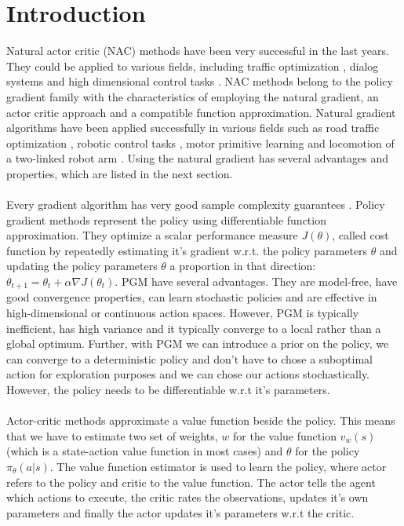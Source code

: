 \section{Introduction}
\label{sec:intro}

Natural actor critic (NAC) methods \citep{peters2005natural} have been very successful in the last years. They could be applied to various fields, including traffic optimization \citep{richter2007natural}, dialog systems \citep{jurvcivcek2011natural} and high dimensional control tasks \citep{peters2007applying, peters2008natural, peters2008reinforcement, peters2003reinforcement}. NAC methods belong to the policy gradient family with the characteristics of employing the natural gradient, an actor critic approach and a compatible function approximation. Natural gradient algorithms have been applied successfully in various fields such as road traffic optimization \cite{richter2007natural}, robotic control tasks \cite{kim2010impedance}, motor primitive learning \cite{peters2007applying} and locomotion of a two-linked robot arm \cite{park2005rls}. Using the natural gradient has several advantages and properties, which are listed in the next section.
\\\\
Every gradient algorithm has very good sample complexity guarantees \cite{nemirovski2005efficient}. Policy gradient methods represent the policy using differentiable function approximation. They optimize a scalar performance measure $J(\theta)$, called cost function by repeatedly estimating it's gradient w.r.t. the policy parameters $\theta$ and updating the policy parameters $\theta$ a proportion in that direction: \(\theta_{t+1} = \theta_{t} + \alpha \nabla J(\theta_{t})\). PGM have several advantages. They are model-free, have good convergence properties, can learn stochastic policies and are effective in high-dimensional or continuous action spaces. However, PGM is typically inefficient, has high variance and it typically converge to a local rather than a global optimum. Further, with PGM we can introduce a prior on the policy, we can converge to a deterministic policy and don't have to chose a suboptimal action for exploration purposes and we can chose our actions stochastically. However, the policy needs to be differentiable w.r.t it's parameters.
\\\\
Actor-critic methods approximate a value function beside the policy. This means that we have to estimate two set of weights, $w$ for the value function $v_w(s)$ (which is a state-action value function in most cases) and $\theta$ for the policy $\pi_{\theta}(a|s)$. The value function estimator is used to learn the policy, where actor refers to the policy and critic to the value function. The actor tells the agent which actions to execute, the critic rates the observations, updates it's own parameters and finally the actor updates it's parameters w.r.t the critic.
